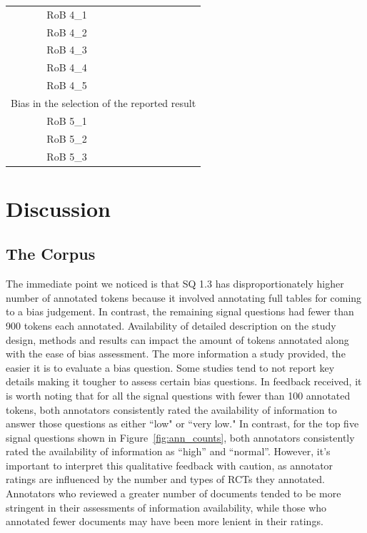 \documentclass[sn-mathphys,Numbered]{sn-jnl}%
\theoremstyle{thmstyleone}%
\theoremstyle{thmstyletwo}%
\theoremstyle{thmstylethree}%
\begin{document}
\begin{table}[htb]
\begin{tabular}{crrr}
        \hline
        RoB 4\_1 & & & \\ 
        RoB 4\_2 & & & \\ 
        RoB 4\_3 & & & \\ 
        RoB 4\_4 & & & \\ 
        RoB 4\_5 & & & \\ 
        \hline
        \multicolumn{4}{c}{Bias in the selection of the reported result} \\
        \hline
        RoB 5\_1 & & & \\ 
        RoB 5\_2 & & & \\ 
        RoB 5\_3 & & & \\
    \bottomrule[1.0pt]
    \end{tabular}
\end{table}
%
%
%
\section{Discussion}
\label{sec:discussion}
%
%
%
\subsection{The Corpus}
\label{disc:corpus}
%
The immediate point we noticed is that SQ 1.3 has disproportionately higher number of annotated tokens because it involved annotating full tables for coming to a bias judgement.
In contrast, the remaining signal questions had fewer than 900 tokens each annotated.
Availability of detailed description on the study design, methods and results can impact the amount of tokens annotated along with the ease of bias assessment.
The more information a study provided, the easier it is to evaluate a bias question.
Some studies tend to not report key details making it tougher to assess certain bias questions.
In feedback received, it is worth noting that for all the signal questions with fewer than 100 annotated tokens, both annotators consistently rated the availability of information to answer those questions as either ``low" or ``very low."
In contrast, for the top five signal questions shown in Figure~\ref{fig:ann_counts}, both annotators consistently rated the availability of information as ``high'' and ``normal''.
However, it's important to interpret this qualitative feedback with caution, as annotator ratings are influenced by the number and types of RCTs they annotated.
Annotators who reviewed a greater number of documents tended to be more stringent in their assessments of information availability, while those who annotated fewer documents may have been more lenient in their ratings.
%
%
%
\end{document}
